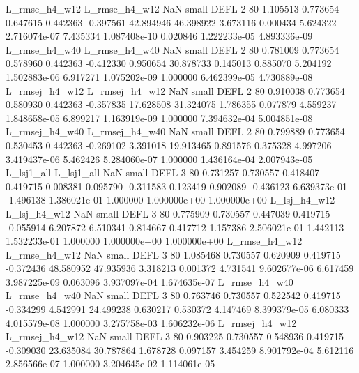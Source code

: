  L_rmse_h4_w12  L_rmse_h4_w12                   NaN      small     DEFL                 2 80 1.105513       0.773654 0.647615       0.442363   -0.397561     42.894946     46.398922     3.673116       0.000434  5.624322 2.716074e-07     7.435334   1.087408e-10            0.020846    1.222233e-05        4.893336e-09
 L_rmse_h4_w40  L_rmse_h4_w40                   NaN      small     DEFL                 2 80 0.781009       0.773654 0.578960       0.442363   -0.412330      0.950654     30.878733     0.145013       0.885070  5.204192 1.502883e-06     6.917271   1.075202e-09            1.000000    6.462399e-05        4.730889e-08
L_rmsej_h4_w12 L_rmsej_h4_w12                   NaN      small     DEFL                 2 80 0.910038       0.773654 0.580930       0.442363   -0.357835     17.628508     31.324075     1.786355       0.077879  4.559237 1.848658e-05     6.899217   1.163919e-09            1.000000    7.394632e-04        5.004851e-08
L_rmsej_h4_w40 L_rmsej_h4_w40                   NaN      small     DEFL                 2 80 0.799889       0.773654 0.530453       0.442363   -0.269102      3.391018     19.913465     0.891576       0.375328  4.997206 3.419437e-06     5.462426   5.284060e-07            1.000000    1.436164e-04        2.007943e-05
    L_lsj1_all     L_lsj1_all                   NaN      small     DEFL                 3 80 0.731257       0.730557 0.418407       0.419715    0.008381      0.095790     -0.311583     0.123419       0.902089 -0.436123 6.639373e-01    -1.496138   1.386021e-01            1.000000    1.000000e+00        1.000000e+00
  L_lsj_h4_w12   L_lsj_h4_w12                   NaN      small     DEFL                 3 80 0.775909       0.730557 0.447039       0.419715   -0.055914      6.207872      6.510341     0.814667       0.417712  1.157386 2.506021e-01     1.442113   1.532233e-01            1.000000    1.000000e+00        1.000000e+00
 L_rmse_h4_w12  L_rmse_h4_w12                   NaN      small     DEFL                 3 80 1.085468       0.730557 0.620909       0.419715   -0.372436     48.580952     47.935936     3.318213       0.001372  4.731541 9.602677e-06     6.617459   3.987225e-09            0.063096    3.937097e-04        1.674635e-07
 L_rmse_h4_w40  L_rmse_h4_w40                   NaN      small     DEFL                 3 80 0.763746       0.730557 0.522542       0.419715   -0.334299      4.542991     24.499238     0.630217       0.530372  4.147469 8.399379e-05     6.080333   4.015579e-08            1.000000    3.275758e-03        1.606232e-06
L_rmsej_h4_w12 L_rmsej_h4_w12                   NaN      small     DEFL                 3 80 0.903225       0.730557 0.548936       0.419715   -0.309030     23.635084     30.787864     1.678728       0.097157  3.454259 8.901792e-04     5.612116   2.856566e-07            1.000000    3.204645e-02        1.114061e-05
